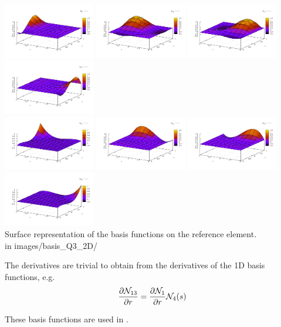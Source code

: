 \begin{center}
\includegraphics[width=4cm]{images/basis_Q3_2D/N9}
\includegraphics[width=4cm]{images/basis_Q3_2D/N10}
\includegraphics[width=4cm]{images/basis_Q3_2D/N11}
\includegraphics[width=4cm]{images/basis_Q3_2D/N12}\\
\includegraphics[width=4cm]{images/basis_Q3_2D/N13}
\includegraphics[width=4cm]{images/basis_Q3_2D/N14}
\includegraphics[width=4cm]{images/basis_Q3_2D/N15}
\includegraphics[width=4cm]{images/basis_Q3_2D/N16}\\
{\captionfont Surface representation of the basis functions on the reference element.\\
{\color{gray} in images/basis\_Q3\_2D/ }}
\end{center}

The derivatives are trivial to obtain from the derivatives of the 1D basis functions, 
e.g.
\[
\frac{\partial {\mathcal{N}}_{13}}{\partial r} = 
\frac{\partial {\mathcal{N}}_{1}}{\partial r} {\mathcal{N}}_4(s) 
\]

These basis functions are used in .



